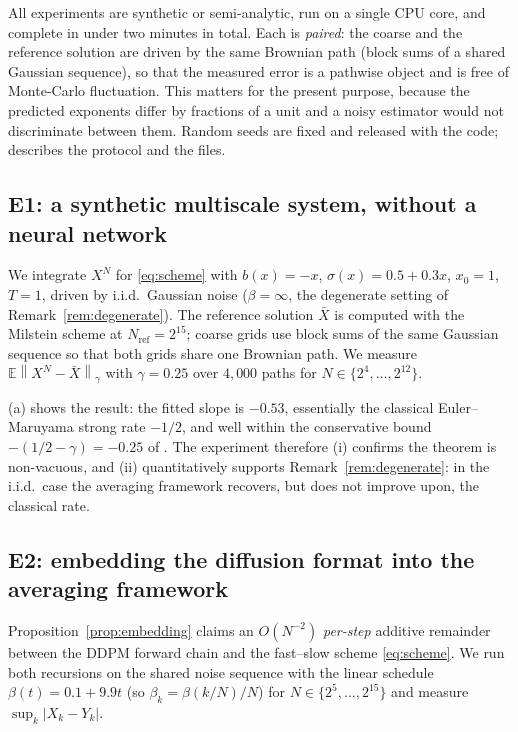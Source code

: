 \documentclass[a4paper,fleqn]{cas-dc}
\theoremstyle{definition}
\newcommand{\E}{\mathbb{E}}
\newcommand{\norm}[1]{\left\lVert#1\right\rVert}
\newcommand{\holder}[1]{\norm{#1}_{\gamma}}
\begin{document}
All experiments are synthetic or semi-analytic, run on a single CPU core, and complete
in under two minutes in total. Each is \emph{paired}: the coarse and the reference
solution are driven by the same Brownian path (block sums of a shared Gaussian
sequence), so that the measured error is a pathwise object and is free of Monte-Carlo
fluctuation. This matters for the present purpose, because the predicted exponents
differ by fractions of a unit and a noisy estimator would not discriminate between
them. Random seeds are fixed and released with the code;  describes
the protocol and the files.


\subsection{E1: a synthetic multiscale system, without a neural network}
\label{sec:exp-e1}

We integrate $X^{N}$ for \eqref{eq:scheme} with $b(x)=-x$,
$\sigma(x)=0.5+0.3x$, $x_{0}=1$, $T=1$, driven by i.i.d.\ Gaussian noise
($\beta=\infty$, the degenerate setting of Remark~\ref{rem:degenerate}).
The reference solution $\bar X$ is computed with the Milstein scheme at
$N_{\mathrm{ref}}=2^{15}$; coarse grids use block sums of the same Gaussian
sequence so that both grids share one Brownian path. We measure
$\E\holder{X^{N}-\bar X}$ with $\gamma=0.25$ over $4{,}000$ paths for
$N\in\{2^{4},\dots,2^{12}\}$.

(a) shows the result: the fitted slope is $-0.53$, essentially the
classical Euler--Maruyama strong rate $-1/2$, and well within the
conservative bound $-(1/2-\gamma)=-0.25$ of . The experiment
therefore (i) confirms the theorem is non-vacuous, and (ii) quantitatively
supports Remark~\ref{rem:degenerate}: in the i.i.d.\ case the averaging framework
recovers, but does not improve upon, the classical rate.

\subsection{E2: embedding the diffusion format into the averaging framework}
\label{sec:exp-e2}

Proposition~\ref{prop:embedding} claims an $O(N^{-2})$ \emph{per-step} additive remainder
between the DDPM forward chain and the fast--slow scheme \eqref{eq:scheme}.
We run both recursions on the shared noise sequence with the linear schedule
$\beta(t)=0.1+9.9t$ (so $\beta_{k}=\beta(k/N)/N$) for
$N\in\{2^{5},\dots,2^{15}\}$ and measure $\sup_{k}\lvert X_{k}-Y_{k}\rvert$.
\end{document}
